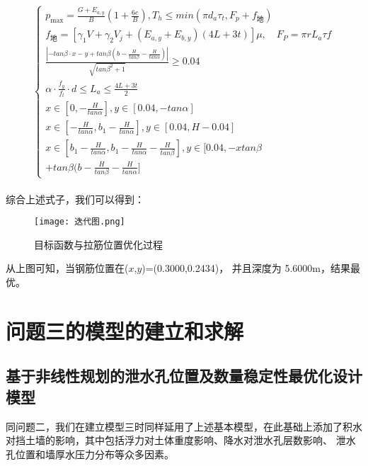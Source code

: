 \documentclass[withoutpreface,bwprint]{cumcmthesis}
\begin{document}
\begin{equation}
\begin{array}{c}
\begin{aligned}
\begin{cases}
                    p_{\text{max}} = \frac{G + E_{a,y}}{B} \left(1 + \frac{6e}{B}\right),
                    T_h\le min(\pi d_a\tau _t,F_p+f_\text{地} )\\
                    f_\text{地}=[\gamma _1V+\gamma _2V_j+(E_{a,y}+ E_{b,y})(4L+3t)]\mu ,\quad F_P=\pi rL_a\tau f\\
                     \frac{|-tan\beta \cdot x-y+tan\beta(b-\frac{H}{tan\beta}- \frac{H}{tan\alpha})|}{\sqrt{tan\beta^2+1} }\ge 0.04 \\
                    \alpha \cdot \frac{f_y}{f_t} \cdot d\le L_a\le \frac{4L+3t}{2}\\
                    x\in [0,-\frac{H}{tan\alpha } ],y\in [0.04, -tan\alpha ] \\
                    x\in [-\frac{H}{tan\alpha } ,b_1-\frac{H}{tan\alpha } ],y\in [0.04, H-0.04 ] \\
                    x\in [b_1-\frac{H}{tan\alpha } ,b_1-\frac{H}{tan\alpha }- \frac{H}{tan\beta }],y\in [0.04, -xtan\beta\\+tan\beta(b-\frac{H}{tan\beta}- \frac{H}{tan\alpha} ] 
                \end{cases}
            \end{aligned}
    \end{array}
\end{equation}

综合上述式子，我们可以得到：
    \begin{figure}[H]
        \centering
        \texttt{[image: 迭代图.png]}
        \caption{目标函数与拉筋位置优化过程}
        \label{fig:目标函数与拉筋位置优化过程}
    \end{figure}

从上图可知，当钢筋位置在($x$,$y$)=(0.3000,0.2434)， 并且深度为 5.6000m，结果最优。



\section{问题三的模型的建立和求解}
\subsection{基于非线性规划的泄水孔位置及数量稳定性最优化设计模型}
同问题二，我们在建立模型三时同样延用了上述基本模型，在此基础上添加了积水对挡土墙的影响，其中包括浮力对土体重度影响、降水对泄水孔层数影响、
泄水孔位置和墙厚水压力分布等众多因素。
\end{document}

